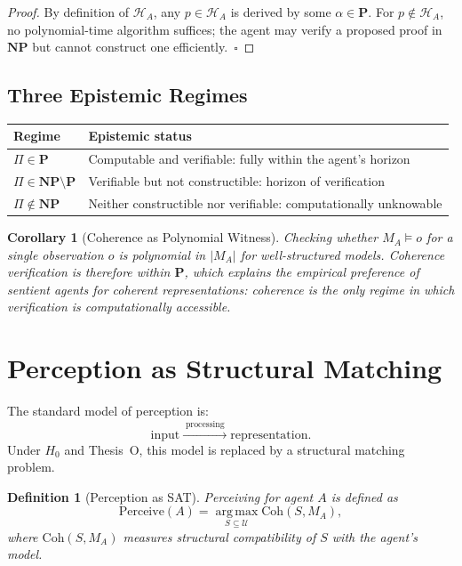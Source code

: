 \documentclass{article}
\newcommand{\Univ}{\mathcal{U}}
\newcommand{\CohTriple}{\mathrm{Coh}}
\newcommand{\Horizon}{\mathcal{H}}
\newcommand{\MA}{M_A}
\newtheorem{corollary}[theorem]{Corollary}
\newtheorem{definition}{Definition}
\begin{document}
\begin{proof}
By definition of $\Horizon_A$, any $p \in \Horizon_A$ is derived by some
$\alpha \in \mathbf{P}$.  For $p \notin \Horizon_A$, no polynomial-time
algorithm suffices; the agent may verify a proposed proof in $\mathbf{NP}$ but
cannot construct one efficiently.~$\square$
\end{proof}

\subsection{Three Epistemic Regimes}

\begin{center}
\renewcommand{\arraystretch}{1.25}
\begin{tabular}{ll}
\toprule
Regime & Epistemic status \\
\midrule
$\Pi \in \mathbf{P}$ &
  Computable and verifiable: fully within the agent's horizon \\
$\Pi \in \mathbf{NP} \setminus \mathbf{P}$ &
  Verifiable but not constructible: horizon of verification \\
$\Pi \notin \mathbf{NP}$ &
  Neither constructible nor verifiable: computationally unknowable \\
\bottomrule
\end{tabular}
\end{center}

\begin{corollary}[Coherence as Polynomial Witness]
Checking whether $\MA \models o$ for a single observation $o$ is polynomial in
$|\MA|$ for well-structured models.  Coherence verification is therefore within
$\mathbf{P}$, which explains the empirical preference of sentient agents for
coherent representations: coherence is the only regime in which verification is
computationally accessible.
\end{corollary}

\section{Perception as Structural Matching}
\label{sec:perception}

The standard model of perception is:
\[
  \text{input} \;\xrightarrow{\;\text{processing}\;}\; \text{representation.}
\]
Under $H_0$ and Thesis~O, this model is replaced by a structural matching
problem.

\begin{definition}[Perception as SAT]
Perceiving for agent $A$ is defined as
\[
  \mathrm{Perceive}(A)
  = \operatorname*{arg\,max}_{S \subseteq \Univ} \CohTriple(S, \MA),
\]
where $\CohTriple(S, \MA)$ measures structural compatibility of $S$ with the
agent's model.
\end{definition}
\end{document}
